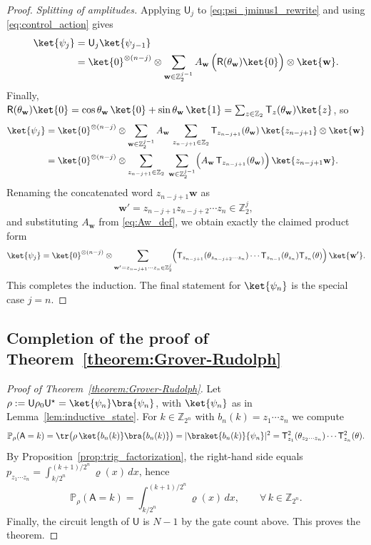 \documentclass{article}
\newcommand{\rR}{\mathsf{R}}
\newcommand{\rU}{\mathsf{U}}
\newcommand{\rA}{\mathsf{A}}
\numberwithin{equation}{section}
\begin{document}
\begin{proof}
\smallskip
\noindent\emph{Splitting of amplitudes.}
Applying $\rU_j$ to \eqref{eq:psi_jminus1_rewrite} and using \eqref{eq:control_action} gives
\begin{align*}
\ket{\psi_j}
&=\rU_j\ket{\psi_{j-1}}\\
&=
\ket{0}^{\otimes(n-j)}\otimes
\sum_{\mathbf{w}\in\mathbb{Z}_2^{j-1}} A_{\mathbf{w}}\,
\Bigl(\rR(\theta_{\mathbf{w}})\ket{0}\Bigr)\otimes\ket{\mathbf{w}}.
\end{align*}
Finally, $\rR(\theta_{\mathbf{w}})\ket{0}=\cos\theta_{\mathbf{w}}\,\ket{0}+\sin\theta_{\mathbf{w}}\,\ket{1}
=\sum_{z\in\mathbb{Z}_2}\mathsf{T}_{z}(\theta_{\mathbf{w}})\ket{z}$, so
\begin{align*}
\ket{\psi_j}
&=
\ket{0}^{\otimes(n-j)}\otimes
\sum_{\mathbf{w}\in\mathbb{Z}_2^{j-1}} A_{\mathbf{w}}\,
\sum_{z_{n-j+1}\in\mathbb{Z}_2}\mathsf{T}_{z_{n-j+1}}(\theta_{\mathbf{w}})\,
\ket{z_{n-j+1}}\otimes\ket{\mathbf{w}}\\
&=
\ket{0}^{\otimes(n-j)}\otimes
\sum_{z_{n-j+1}\in\mathbb{Z}_2}\;
\sum_{\mathbf{w}\in\mathbb{Z}_2^{j-1}}
\Bigl(A_{\mathbf{w}}\,\mathsf{T}_{z_{n-j+1}}(\theta_{\mathbf{w}})\Bigr)\,
\ket{z_{n-j+1}\mathbf{w}}.
\end{align*}
Renaming the concatenated word $z_{n-j+1}\mathbf{w}$ as
\[
\mathbf{w}'=z_{n-j+1}z_{n-j+2}\cdots z_n\in\mathbb{Z}_2^j,
\]
and substituting $A_{\mathbf{w}}$ from \eqref{eq:Aw_def}, we obtain exactly the claimed product form
\[
\ket{\psi_j}
=
\ket{0}^{\otimes (n-j)}\otimes
\sum_{\mathbf{w}'=z_{n-j+1}\cdots z_n\in\mathbb{Z}_2^{j}}
\Bigl(\mathsf{T}_{z_{n-j+1}}(\theta_{z_{n-j+2}\cdots z_n})\cdots
\mathsf{T}_{z_{n-1}}(\theta_{z_n})\mathsf{T}_{z_n}(\theta)\Bigr)\,
\ket{\mathbf{w}'}.
\]
This completes the induction. The final statement for $\ket{\psi_n}$ is the special case $j=n$.
\end{proof}


\subsection{Completion of the proof of Theorem~\ref{theorem:Grover-Rudolph}}\label{subsec:completion}

\begin{proof}[Proof of Theorem~\ref{theorem:Grover-Rudolph}]
Let $\rho:=\rU\rho_0\rU^\star=\ket{\psi_n}\bra{\psi_n}$, with $\ket{\psi_n}$ as in
Lemma~\ref{lem:inductive_state}. For $k\in\mathbb{Z}_{2^n}$ with $b_n(k)=z_1\cdots z_n$ we compute
\[
\mathbb{P}_{\rho}(\rA=k)
=\tr\bigl(\rho\,\ket{b_n(k)}\bra{b_n(k)}\bigr)
=|\braket{b_n(k)}{\psi_n}|^2
=\mathsf{T}_{z_1}^2(\theta_{z_2\cdots z_n})\cdots \mathsf{T}_{z_n}^2(\theta).
\]
By Proposition~\ref{prop:trig_factorization}, the right-hand side equals
$p_{z_1\cdots z_n}=\int_{k/2^n}^{(k+1)/2^n}\varrho(x)\,dx$, hence
\[
\mathbb{P}_{\rho}(\rA=k)=\int_{k/2^n}^{(k+1)/2^n}\varrho(x)\,dx,
\qquad \forall\,k\in\mathbb{Z}_{2^n}.
\]
Finally, the circuit length of $\rU$ is $N-1$ by the gate count above. This proves the theorem.
\end{proof}
\end{document}
